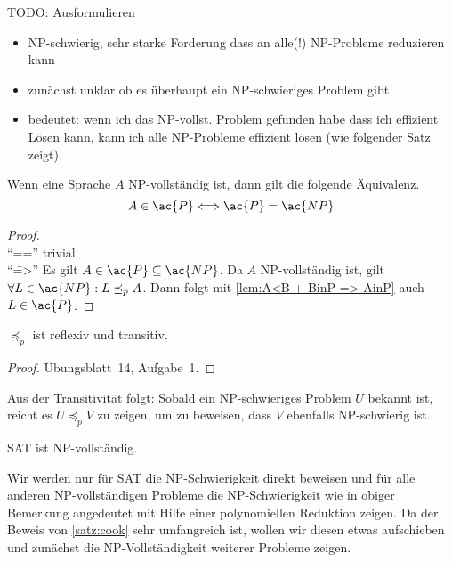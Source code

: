 {\color{red}
TODO: Ausformulieren
\begin{itemize}
 \item \ac{NP}-schwierig, sehr starke Forderung dass an alle(!) \ac{NP}-Probleme reduzieren kann
 \item zunächst unklar ob es überhaupt ein \ac{NP}-schwieriges Problem gibt
 \item bedeutet: wenn ich das \ac{NP}-vollst. Problem gefunden habe dass ich effizient Lösen kann, kann ich alle \ac{NP}-Probleme effizient lösen (wie folgender Satz zeigt).
\end{itemize}
}
\begin{Satz}
	Wenn eine Sprache $A$ \ac{NP}-vollständig ist, dann gilt die folgende Äquivalenz.
	\[ A\in \ac{P} \<==> \ac{P} =\ac{NP} \qedhere \]
\end{Satz}
\begin{proof}\ \\
	"`\<=="' trivial.\\
	"`\==>"' Es gilt $A\in \ac{P} \subseteq \ac{NP}$. Da $A$ \ac{NP}-vollständig ist, gilt $\forall L\in \ac{NP}: L\preceq_p A$. Dann folgt mit \autoref{lem:A<B + BinP => AinP} auch $L\in \ac{P}$.
\end{proof}

\begin{lemma}[name={[$\preceq_p$ ist reflexiv und transitiv]}]
	$\preceq_p$ ist reflexiv und transitiv.
\end{lemma}
\begin{proof}
Übungsblatt~14, Aufgabe~1.
\end{proof}

\begin{Bem}
    Aus der Transitivität folgt:
	Sobald ein \ac{NP}-schwieriges Problem $U$ bekannt ist, reicht es $U\preceq_p V$ zu zeigen, um zu beweisen, dass $V$ ebenfalls \ac{NP}-schwierig ist.
\end{Bem}

\begin{Satz}[Cook]\label{satz:cook}
	\ac{SAT} ist \ac{NP}-vollständig.
\end{Satz}
Wir werden nur für \ac{SAT} die \ac{NP}-Schwierigkeit direkt beweisen und für alle anderen \ac{NP}-vollständigen Probleme die \ac{NP}-Schwierigkeit wie in obiger Bemerkung angedeutet mit Hilfe einer polynomiellen Reduktion zeigen.
Da der Beweis von \autoref{satz:cook} sehr umfangreich ist, wollen wir diesen etwas aufschieben und zunächst die \ac{NP}-Vollständigkeit weiterer Probleme zeigen.


